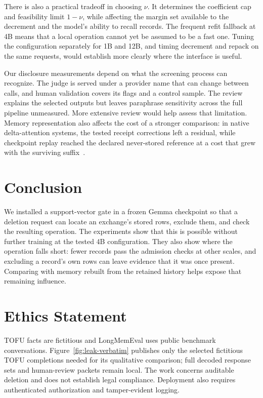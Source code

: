 There is also a practical tradeoff in choosing \(\nu\). It determines the
coefficient cap and feasibility limit \(1-\nu\), while affecting the margin
set available to the decrement and the model's ability to recall records.
The frequent refit fallback at 4B means that a local operation cannot yet be
assumed to be a fast one. Tuning the configuration separately for 1B and
12B, and timing decrement and repack on the same requests, would establish
more clearly where the interface is useful.

Our disclosure measurements depend on what the screening process can
recognize. The judge is served under a provider name that can change between
calls, and human validation covers its flags and a control sample. The
review explains the selected outputs but leaves paraphrase sensitivity
across the full pipeline unmeasured. More extensive review would help assess
that limitation. Memory representation also affects the cost of a stronger
comparison: in native delta-attention systems, the tested receipt corrections
left a residual, while checkpoint replay reached the declared never-stored
reference at a cost that grew with the surviving suffix~\citep{kdaomission}.

\section{Conclusion}

We installed a support-vector gate in a frozen Gemma checkpoint so that a
deletion request can locate an exchange's stored rows, exclude them, and
check the resulting operation. The experiments show that this is possible
without further training at the tested 4B configuration. They also show
where the operation falls short: fewer records pass the admission checks at
other scales, and excluding a record's own rows can leave evidence that it
was once present. Comparing with memory rebuilt from the retained history
helps expose that remaining influence.

\FloatBarrier
\label{main-text-end}

\section*{Ethics Statement}
TOFU facts are fictitious and LongMemEval uses public benchmark conversations.
Figure~\ref{fig:leak-verbatim} publishes only the selected fictitious TOFU
completions needed for its qualitative comparison; full decoded response sets
and human-review packets remain local. The work concerns auditable deletion and
does not establish legal compliance. Deployment also requires authenticated
authorization and tamper-evident logging.

